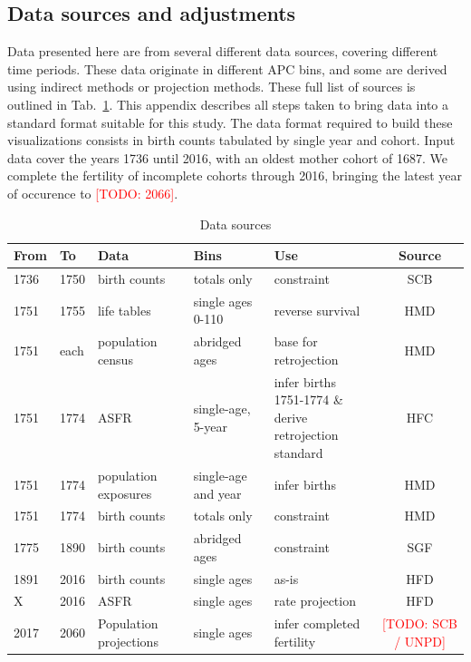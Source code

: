 \documentclass{article}
\newcommand\todo[1]{\textcolor{red}{[TODO: #1]}}
\begin{document}
\pagebreak
\begin{appendix}
\section{Data sources and adjustments}
\label{sec:dataprep}
Data presented here are from several different data sources, covering different time periods. These data originate in different APC bins, and some are derived using indirect methods or projection methods. These full list of sources is outlined in Tab.~\ref{app:sources}. This appendix describes all steps taken to bring data into a standard format suitable for this study. The data format required to build these visualizations consists in birth counts tabulated by single year and cohort. Input data cover the years 1736 until 2016, with an oldest mother cohort of 1687. We complete the fertility of incomplete cohorts through 2016, bringing the latest year of occurence to \todo{2066}.

\begin{table}[ht]
\begin{tabular}{lllllc}
From & To & Data & Bins & Use & Source \\ \hline
1736 & 1750 & birth counts & totals only & constraint & SCB \\
1751 & 1755 & life tables & single ages 0-110 & reverse survival & HMD \\
1751 & each & population census & abridged ages & base for retrojection & HMD \\
1751 & 1774 & ASFR & single-age, 5-year & \makecell{infer births 1751-1774 \&\\ derive retrojection standard} & HFC \\
1751 & 1774 & population exposures & single-age and year & infer births & HMD \\
1751 & 1774 & birth counts & totals only & constraint & HMD \\
1775 & 1890 & birth counts & abridged ages & constraint & SGF \\
1891 & 2016 & birth counts & single ages & as-is & HFD \\
X & 2016 & ASFR & single ages & rate projection & HFD \\
2017 & 2060 & Population projections & single ages & infer completed fertility &\todo{ SCB / UNPD}
\end{tabular}
\caption{Data sources}
\label{app:sources}
\end{table}


\end{appendix}
\end{document}
